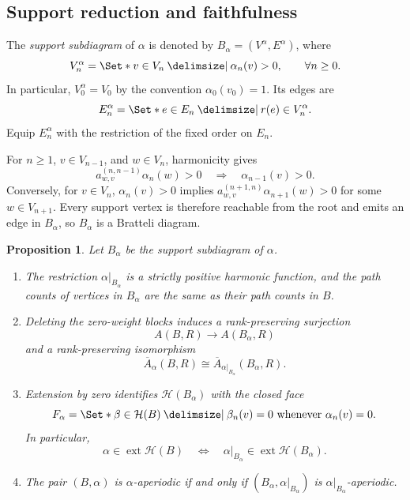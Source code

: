 \documentclass[11pt]{amsart}
\providecommand\given{}
\newcommand\SetSymbol[1][]{%
  \nonscript\:#1\vert\allowbreak\nonscript\:\mathopen{}%
}
\renewcommand\given{\SetSymbol[\delimsize]}#1%
\newtheorem{proposition}[theorem]{Proposition}
\theoremstyle{definition}
\theoremstyle{remark}
\begin{document}
\subsection{Support reduction and faithfulness}

The \emph{support subdiagram} of $\alpha$ is denoted by
$B_\alpha=(V^\alpha,E^\alpha)$, where
\[
  V_n^\alpha=\Set*{v\in V_n \given \alpha_n(v)>0},
  \qquad \forall n\geq0.
\]
In particular, $V_0^\alpha=V_0$ by the convention $\alpha_0(v_0)=1$.
Its edges are
\[
 E_n^\alpha=\Set*{e\in E_n\given r(e)\in V_n^\alpha}.
\]
Equip $E_n^\alpha$ with the restriction of the fixed order on $E_n$.

For $n\geq1$, $v\in V_{n-1}$, and $w\in V_n$, harmonicity gives
\[
 a_{w,v}^{(n,n-1)}\alpha_n(w)>0
 \quad\Longrightarrow\quad\alpha_{n-1}(v)>0.
\]
Conversely, for $v\in V_n$, $\alpha_n(v)>0$ implies
$a_{w,v}^{(n+1,n)}\alpha_{n+1}(w)>0$ for some $w\in V_{n+1}$.
Every support vertex is therefore reachable from the root and emits an
edge in $B_\alpha$, so $B_\alpha$ is a Bratteli diagram.

\begin{proposition}\label{prop:support-reduction}
Let $B_\alpha$ be the support subdiagram of $\alpha$.
\begin{enumerate}[label=(\alph*), ref=\alph*]
\item\label{item:support-harmonic} The restriction $\alpha|_{B_\alpha}$ is a strictly positive harmonic
  function, and the path counts of vertices in $B_\alpha$ are the same
  as their path counts in $B$.
\item\label{item:support-rank} Deleting the zero-weight blocks induces a rank-preserving surjection
  \[
    A(B,R)\longrightarrow A(B_\alpha,R)
  \]
  and a rank-preserving isomorphism
  \begin{equation}\label{eq:support-completion}
    \overline A_\alpha(B,R)
    \cong
    \overline A_{\alpha|_{B_\alpha}}(B_\alpha,R).
  \end{equation}
\item\label{item:support-face} Extension by zero identifies $\mathcal H(B_\alpha)$ with the closed face
  \[
    F_\alpha=
    \Set*{\beta\in\mathcal H(B) \given
      \beta_n(v)=0\text{ whenever }\alpha_n(v)=0}.
  \]
  In particular,
  \[
    \alpha\in\operatorname{ext}\mathcal H(B)
    \quad\Longleftrightarrow\quad
    \alpha|_{B_\alpha}\in\operatorname{ext}\mathcal H(B_\alpha).
  \]
\item\label{item:support-aperiodic} The pair $(B,\alpha)$ is $\alpha$-aperiodic if and only if
  $(B_\alpha,\alpha|_{B_\alpha})$ is $\alpha|_{B_\alpha}$-aperiodic.
\end{enumerate}
\end{proposition}
\end{document}
